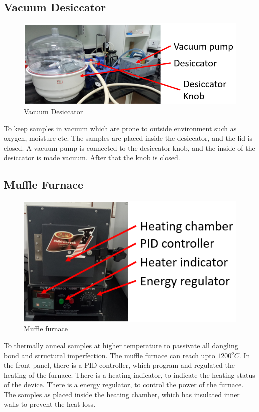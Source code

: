 \documentclass[12pt,a4paper,bold]{thesis}
\theoremstyle{thm}
\theoremstyle{definition}
\begin{document}
\subsection{Vacuum Desiccator}
\begin{figure}[H]
	\centering
   \includegraphics[scale=0.56]{Images/11.png} 
   \caption{Vacuum Desiccator}
\end{figure}
To keep samples in vacuum which are prone to outside environment such as oxygen, moisture etc. The samples are placed inside the desiccator, and the lid is closed. A vacuum pump is connected to the desiccator knob, and the inside of the desiccator is made vacuum. After that the knob is closed.

\subsection{Muffle Furnace}
\begin{figure}[H]
	\centering
   \includegraphics[scale=0.56]{Images/12.png} 
   \caption{Muffle furnace}
\end{figure}
To thermally anneal samples at higher temperature to passivate all dangling bond and structural imperfection. The muffle furnace can reach upto $1200^oC$. In the front panel, there is a PID controller, which program and regulated the heating of the furnace. There is a heating indicator, to indicate the heating status of the device. There is a energy regulator, to control the power of the furnace. The samples as placed inside the heating chamber, which has insulated inner walls to prevent the heat loss.  
\end{document}
